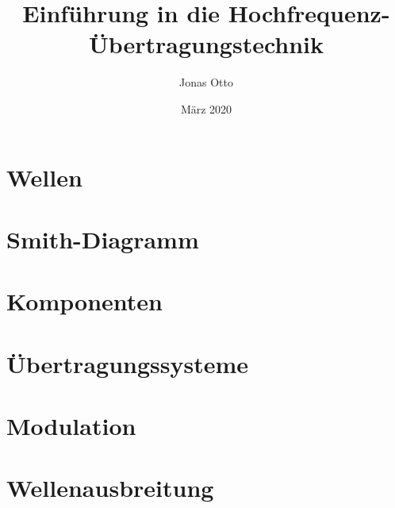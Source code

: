 \documentclass{report}
\title{Einführung in die Hochfrequenz-Übertragungstechnik}
\author{Jonas Otto}
\date{März 2020}
\begin{document}
\tableofcontents
\maketitle

\chapter{Wellen}

\chapter{Smith-Diagramm}


\chapter{Komponenten}
\chapter{Übertragungssysteme}
\chapter{Modulation}
\chapter{Wellenausbreitung}
\end{document}

